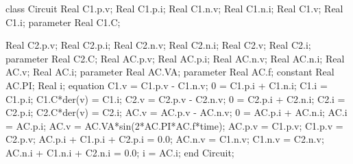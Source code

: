 \begin{boxedverbatim}
class Circuit
  Real C1.p.v;
  Real C1.p.i;
  Real C1.n.v;
  Real C1.n.i;
  Real C1.v;
  Real C1.i;
  parameter Real C1.C;

  Real C2.p.v;
  Real C2.p.i;
  Real C2.n.v;
  Real C2.n.i;
  Real C2.v;
  Real C2.i;
  parameter Real C2.C;
  Real AC.p.v;
  Real AC.p.i;
  Real AC.n.v;
  Real AC.n.i;
  Real AC.v;
  Real AC.i;
  parameter Real AC.VA;
  parameter Real AC.f;
  constant Real AC.PI;
  Real i;
equation
  C1.v = C1.p.v - C1.n.v;
  0 = C1.p.i + C1.n.i; 
  C1.i = C1.p.i;
  C1.C*der(v) = C1.i;
  C2.v = C2.p.v - C2.n.v;
  0 = C2.p.i + C2.n.i; 
  C2.i = C2.p.i;
  C2.C*der(v) = C2.i;
  AC.v = AC.p.v - AC.n.v;
  0 = AC.p.i + AC.n.i; 
  AC.i = AC.p.i;
  AC.v = AC.VA*sin(2*AC.PI*AC.f*time);
  AC.p.v = C1.p.v;
  C1.p.v = C2.p.v;
  AC.p.i + C1.p.i + C2.p.i = 0.0;
  AC.n.v = C1.n.v;
  C1.n.v = C2.n.v;
  AC.n.i + C1.n.i + C2.n.i = 0.0;
  i = AC.i;
end Circuit;
\end{boxedverbatim}
